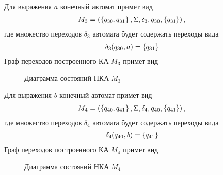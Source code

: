 Для выражения \(a\) конечный автомат примет вид
\begin{align*}
	M_3 = \left(\left\{q_{30}, q_{31}\right\}, \Sigma, \delta_3, q_{30}, \left\{q_{31}\right\}\right),
\end{align*}
где множество переходов \(\delta_3\) автомата будет содержать переходы вида
\begin{align*}
	\delta_3(q_{30}, a) = \left\{q_{31}\right\}
\end{align*}
Граф переходов построенного КА \(M_3\) примет вид
\begin{figure}[h!]
	\centering
	\caption{Диаграмма состояний НКА \(M_3\)}
\end{figure}

Для выражения \(b\) конечный автомат примет вид
\begin{align*}
	M_4 = \left(\left\{q_{40}, q_{41}\right\}, \Sigma, \delta_4, q_{40}, \left\{q_{41}\right\}\right),
\end{align*}
где множество переходов \(\delta_4\) автомата будет содержать переходы вида
\begin{align*}
	\delta_4(q_{40}, b) = \left\{q_{41}\right\}
\end{align*}
Граф переходов построенного КА \(M_4\) примет вид
\begin{figure}[h!]
	\centering
	\caption{Диаграмма состояний НКА \(M_4\)}
\end{figure}

